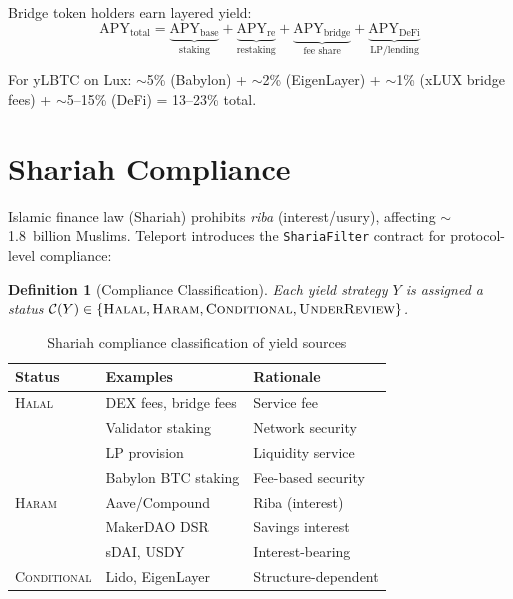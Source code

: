 \documentclass[11pt]{article}
\newtheorem{definition}{Definition}
\begin{document}
Bridge token holders earn layered yield:
\begin{equation}
  \text{APY}_{\text{total}} = \underbrace{\text{APY}_{\text{base}}}_{\text{staking}} + \underbrace{\text{APY}_{\text{re}}}_{\text{restaking}} + \underbrace{\text{APY}_{\text{bridge}}}_{\text{fee share}} + \underbrace{\text{APY}_{\text{DeFi}}}_{\text{LP/lending}}
\end{equation}

For yLBTC on Lux: $\sim$5\% (Babylon) + $\sim$2\% (EigenLayer) + $\sim$1\% (xLUX bridge fees) + $\sim$5--15\% (DeFi) = 13--23\% total.

\section{Shariah Compliance}
\label{sec:shariah}

Islamic finance law (Shariah) prohibits \emph{riba} (interest/usury), affecting $\sim$1.8~billion Muslims. Teleport introduces the \texttt{ShariaFilter} contract for protocol-level compliance:

\begin{definition}[Compliance Classification]
Each yield strategy $Y$ is assigned a status $\mathcal{C}(Y) \in \{\textsc{Halal}, \textsc{Haram}, \textsc{Conditional}, \textsc{UnderReview}\}$.
\end{definition}

\begin{table}[h]
\centering
\small
\begin{tabular}{lll}
\toprule
\textbf{Status} & \textbf{Examples} & \textbf{Rationale} \\
\midrule
\textsc{Halal} & DEX fees, bridge fees & Service fee \\
& Validator staking & Network security \\
& LP provision & Liquidity service \\
& Babylon BTC staking & Fee-based security \\
\midrule
\textsc{Haram} & Aave/Compound & Riba (interest) \\
& MakerDAO DSR & Savings interest \\
& sDAI, USDY & Interest-bearing \\
\midrule
\textsc{Conditional} & Lido, EigenLayer & Structure-dependent \\
\bottomrule
\end{tabular}
\caption{Shariah compliance classification of yield sources}
\label{tab:shariah}
\end{table}
\end{document}
